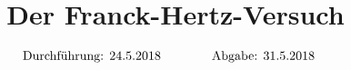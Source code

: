 

\subject{V601}
\title{Der Franck-Hertz-Versuch }

\date{
  \begin{align}
    \text{Durchführung: } & \text{24.5.2018} & \hspace{3em} & \text{Abgabe: 31.5.2018} \notag
  \end{align}
}



\maketitle
\thispagestyle{empty}
\tableofcontents
\newpage






\nocite{*}
\printbibliography{}


